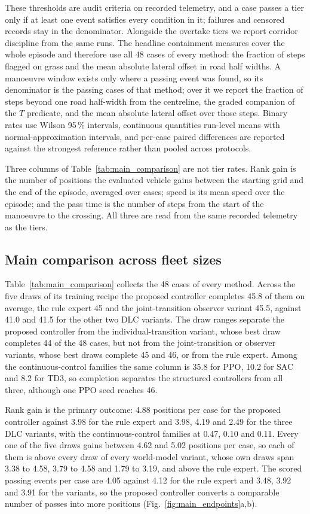 \documentclass[journal]{IEEEtran}
\begin{document}
These thresholds are audit criteria on recorded telemetry, and a case passes a
tier only if at least one event satisfies every condition in it; failures and
censored records stay in the denominator. Alongside the overtake tiers we report
corridor discipline from the same runs. The headline containment measures cover
the whole episode and therefore use all 48 cases of every method: the fraction
of steps flagged on grass and the mean absolute lateral offset in road half
widths. A manoeuvre window exists only where a passing event was found, so its
denominator is the passing cases of that method; over it we report the fraction
of steps beyond one road half-width from the centreline, the graded companion of
the $T$ predicate, and the mean absolute lateral offset over those steps. Binary
rates use Wilson 95\,\% intervals, continuous quantities run-level means with
normal-approximation intervals, and per-case paired differences are reported
against the strongest reference rather than pooled across protocols.

Three columns of Table~\ref{tab:main_comparison} are not tier rates. Rank gain
is the number of positions the evaluated vehicle gains between the starting grid
and the end of the episode, averaged over cases; speed is its mean speed over
the episode; and the pass time is the number of steps from the start of the
manoeuvre to the crossing. All three are read from the same recorded telemetry
as the tiers.

\subsection{Main comparison across fleet sizes}
\label{sec:main_comparison}

Table~\ref{tab:main_comparison} collects the 48 cases of every method. Across
the five draws of its training recipe the proposed controller completes 45.8 of
them on average, the rule expert 45 and the joint-transition observer variant
45.5, against 41.0 and 41.5 for the other two DLC variants. The draw ranges
separate the proposed controller from the individual-transition variant, whose
best draw completes 44 of the 48 cases, but not from the joint-transition or
observer variants, whose best draws complete 45 and 46, or from the rule
expert. Among the continuous-control families the same column is 35.8 for PPO,
10.2 for SAC and 8.2 for TD3, so completion separates the structured controllers
from all three, although one PPO seed reaches 46.

Rank gain is the primary outcome: 4.88 positions per case for the proposed
controller against 3.98 for the rule expert and 3.98, 4.19 and 2.49 for the
three DLC variants, with the continuous-control families at 0.47, 0.10 and 0.11.
Every one of the five draws gains between 4.62 and 5.02 positions per case, so
each of them is above every draw of every world-model variant, whose own draws
span 3.38 to 4.58, 3.79 to 4.58 and 1.79 to 3.19, and above the rule expert.
The scored passing events per case are 4.05 against 4.12 for the rule expert and
3.48, 3.92 and 3.91 for the variants, so the proposed controller converts a
comparable number of passes into more positions
(Fig.~\ref{fig:main_endpoints}a,b).
\end{document}
